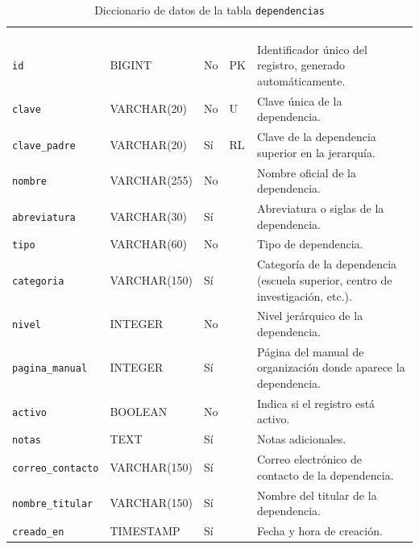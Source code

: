 \footnotesize
\renewcommand{\arraystretch}{1.15}
\setlength{\tabcolsep}{4pt}
\begin{longtable}{|L{3.9cm}|L{2.4cm}|L{0.9cm}|L{1.2cm}|L{6.6cm}|}
	\hiderowcolors\caption{Diccionario de datos de la tabla \texttt{dependencias}}
	\label{tab:dic_dependencias} \\ \showrowcolors
	\hline
	 &  &  &  &  \\
	\hline
	\endfirsthead
	\hline
	 &  &  &  &  \\
	\hline
	\endhead
		\texttt{id} & BIGINT & No & PK & Identificador único del registro, generado automáticamente. \\ \hline
		\texttt{clave} & VARCHAR(20) & No & U & Clave única de la dependencia. \\ \hline
		\texttt{clave\_\allowbreak{}padre} & VARCHAR(20) & Sí & RL & Clave de la dependencia superior en la jerarquía. \\ \hline
		\texttt{nombre} & VARCHAR(255) & No &  & Nombre oficial de la dependencia. \\ \hline
		\texttt{abreviatura} & VARCHAR(30) & Sí &  & Abreviatura o siglas de la dependencia. \\ \hline
		\texttt{tipo} & VARCHAR(60) & No &  & Tipo de dependencia. \\ \hline
		\texttt{categoria} & VARCHAR(150) & Sí &  & Categoría de la dependencia (escuela superior, centro de investigación, etc.). \\ \hline
		\texttt{nivel} & INTEGER & No &  & Nivel jerárquico de la dependencia. \\ \hline
		\texttt{pagina\_\allowbreak{}manual} & INTEGER & Sí &  & Página del manual de organización donde aparece la dependencia. \\ \hline
		\texttt{activo} & BOOLEAN & No &  & Indica si el registro está activo. \\ \hline
		\texttt{notas} & TEXT & Sí &  & Notas adicionales. \\ \hline
		\texttt{correo\_\allowbreak{}contacto} & VARCHAR(150) & Sí &  & Correo electrónico de contacto de la dependencia. \\ \hline
		\texttt{nombre\_\allowbreak{}titular} & VARCHAR(150) & Sí &  & Nombre del titular de la dependencia. \\ \hline
		\texttt{creado\_\allowbreak{}en} & TIMESTAMP & Sí &  & Fecha y hora de creación. \\ \hline
\end{longtable}
\normalsize
\setlength{\tabcolsep}{6pt}
\renewcommand{\arraystretch}{1}

